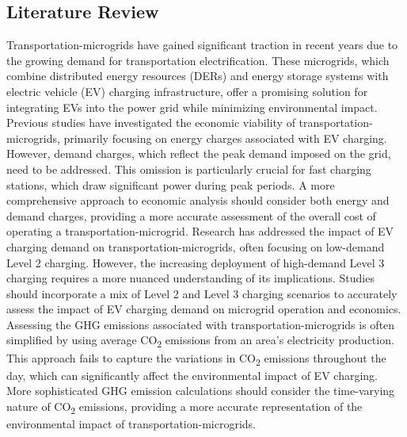 \documentclass[conference]{IEEEtran}
\begin{document}
  	\subsection{Literature Review}
  		Transportation-microgrids have gained significant traction in recent years due to the growing demand for transportation electrification. These microgrids, which combine distributed energy resources (DERs) and energy storage systems with electric vehicle (EV) charging infrastructure, offer a promising solution for integrating EVs into the power grid while minimizing environmental impact. Previous studies have investigated the economic viability of transportation-microgrids, primarily focusing on energy charges associated with EV charging. However, demand charges, which reflect the peak demand imposed on the grid, need to be addressed. This omission is particularly crucial for fast charging stations, which draw significant power during peak periods. A more comprehensive approach to economic analysis should consider both energy and demand charges, providing a more accurate assessment of the overall cost of operating a transportation-microgrid. Research has addressed the impact of EV charging demand on transportation-microgrids, often focusing on low-demand Level 2 charging. However, the increasing deployment of high-demand Level 3 charging requires a more nuanced understanding of its implications. Studies should incorporate a mix of Level 2 and Level 3 charging scenarios to accurately assess the impact of EV charging demand on microgrid operation and economics. Assessing the GHG emissions associated with transportation-microgrids is often simplified by using average CO\textsubscript{2} emissions from an area's electricity production. This approach fails to capture the variations in CO\textsubscript{2} emissions throughout the day, which can significantly affect the environmental impact of EV charging. More sophisticated GHG emission calculations should consider the time-varying nature of CO\textsubscript{2} emissions, providing a more accurate representation of the environmental impact of transportation-microgrids. 
  		
\end{document}

